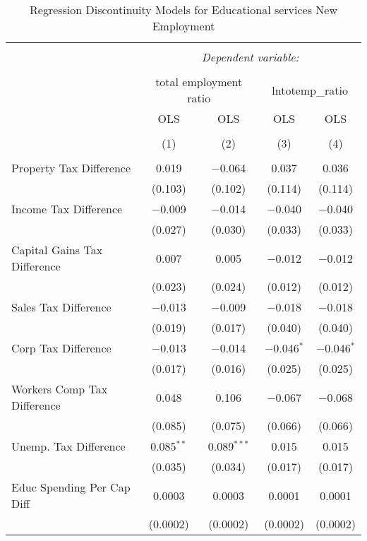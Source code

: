 
\begin{table}[!htbp] \centering 
  \caption{Regression Discontinuity Models for  Educational services New Employment} 
  \label{61rd} 
\begin{tabular}{@{\extracolsep{5pt}}lcccc} 
\\[-1.8ex]\hline 
\hline \\[-1.8ex] 
 & \multicolumn{4}{c}{\textit{Dependent variable:}} \\ 
\cline{2-5} 
\\[-1.8ex] & \multicolumn{2}{c}{total employment ratio} & \multicolumn{2}{c}{lntotemp\_ratio} \\ 
 & OLS & OLS & OLS & OLS \\ 
\\[-1.8ex] & (1) & (2) & (3) & (4)\\ 
\hline \\[-1.8ex] 
 Property Tax Difference & 0.019 & $-$0.064 & 0.037 & 0.036 \\ 
  & (0.103) & (0.102) & (0.114) & (0.114) \\ 
  Income Tax Difference & $-$0.009 & $-$0.014 & $-$0.040 & $-$0.040 \\ 
  & (0.027) & (0.030) & (0.033) & (0.033) \\ 
  Capital Gains Tax Difference & 0.007 & 0.005 & $-$0.012 & $-$0.012 \\ 
  & (0.023) & (0.024) & (0.012) & (0.012) \\ 
  Sales Tax Difference & $-$0.013 & $-$0.009 & $-$0.018 & $-$0.018 \\ 
  & (0.019) & (0.017) & (0.040) & (0.040) \\ 
  Corp Tax Difference & $-$0.013 & $-$0.014 & $-$0.046$^{*}$ & $-$0.046$^{*}$ \\ 
  & (0.017) & (0.016) & (0.025) & (0.025) \\ 
  Workers Comp Tax Difference & 0.048 & 0.106 & $-$0.067 & $-$0.068 \\ 
  & (0.085) & (0.075) & (0.066) & (0.066) \\ 
  Unemp. Tax Difference & 0.085$^{**}$ & 0.089$^{***}$ & 0.015 & 0.015 \\ 
  & (0.035) & (0.034) & (0.017) & (0.017) \\ 
  Educ Spending Per Cap Diff & 0.0003 & 0.0003 & 0.0001 & 0.0001 \\ 
  & (0.0002) & (0.0002) & (0.0002) & (0.0002) \\ 

\end{tabular}
\end{table}

